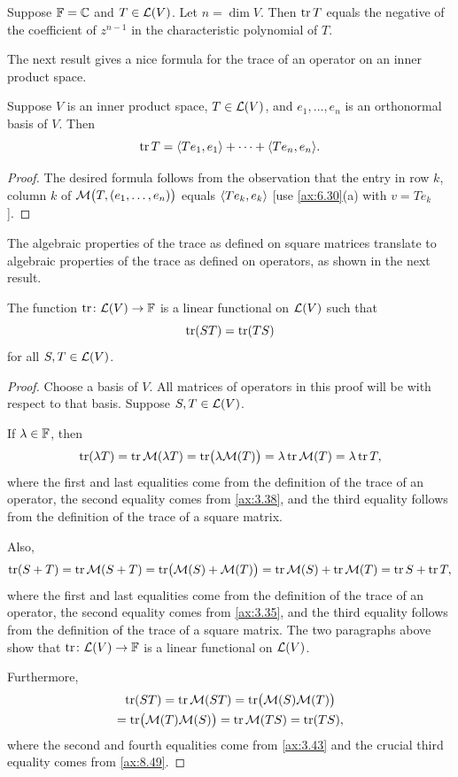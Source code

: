 \begin{result}\label{ax:8.54}
Suppose $\mathbb{F}=\mathbb{C}$ and $T\in\mathcal{L}(V)$. Let $n=\dim V$. Then $\operatorname{tr} T$ equals the
negative of the coefficient of $z^{n-1}$ in the characteristic polynomial of
$T$.
\end{result}

The next result gives a nice formula for the trace of an operator on an inner
product space.

\begin{result}\label{ax:8.55}
Suppose $V$ is an inner product space, $T\in\mathcal{L}(V)$, and $e_1,\dots,e_n$ is an
orthonormal basis of $V$. Then
\[ \operatorname{tr} T = \langle Te_1, e_1 \rangle + \cdots + \langle Te_n, e_n \rangle. \]
\end{result}

\begin{proof}
The desired formula follows from the observation that the entry in row $k$,
column $k$ of $\mathcal{M}\bigl(T,(e_1,\dots,e_n)\bigr)$ equals $\langle Te_k, e_k \rangle$
[use \ref{ax:6.30}(a) with $v=Te_k$].
\end{proof}

The algebraic properties of the trace as defined on square matrices translate
to algebraic properties of the trace as defined on operators, as shown in the
next result.

\begin{result}\label{ax:8.56}
The function $\operatorname{tr}\colon\mathcal{L}(V)\to\mathbb{F}$ is a linear functional on $\mathcal{L}(V)$ such
that
\[ \operatorname{tr}(ST) = \operatorname{tr}(TS) \]
for all $S,T\in\mathcal{L}(V)$.
\end{result}

\begin{proof}
Choose a basis of $V$. All matrices of operators in this proof will be with
respect to that basis. Suppose $S,T\in\mathcal{L}(V)$.

If $\lambda\in\mathbb{F}$, then
\[ \operatorname{tr}(\lambda T) = \operatorname{tr}\mathcal{M}(\lambda T) = \operatorname{tr}\bigl(\lambda\mathcal{M}(T)\bigr)
   = \lambda\operatorname{tr}\mathcal{M}(T) = \lambda\operatorname{tr} T, \]
where the first and last equalities come from the definition of the trace of an
operator, the second equality comes from \ref{ax:3.38}, and the third equality
follows from the definition of the trace of a square matrix.

Also,
\[ \operatorname{tr}(S+T) = \operatorname{tr}\mathcal{M}(S+T) = \operatorname{tr}\bigl(\mathcal{M}(S)+\mathcal{M}(T)\bigr)
   = \operatorname{tr}\mathcal{M}(S) + \operatorname{tr}\mathcal{M}(T) = \operatorname{tr} S + \operatorname{tr} T, \]
where the first and last equalities come from the definition of the trace of an
operator, the second equality comes from \ref{ax:3.35}, and the third equality
follows from the definition of the trace of a square matrix. The two paragraphs
above show that $\operatorname{tr}\colon\mathcal{L}(V)\to\mathbb{F}$ is a linear functional on $\mathcal{L}(V)$.

Furthermore,
\begin{multline*}
\operatorname{tr}(ST) = \operatorname{tr}\mathcal{M}(ST) = \operatorname{tr}\bigl(\mathcal{M}(S)\mathcal{M}(T)\bigr)\\
= \operatorname{tr}\bigl(\mathcal{M}(T)\mathcal{M}(S)\bigr) = \operatorname{tr}\mathcal{M}(TS) = \operatorname{tr}(TS),
\end{multline*}
where the second and fourth equalities come from \ref{ax:3.43} and the crucial
third equality comes from \ref{ax:8.49}.
\end{proof}

